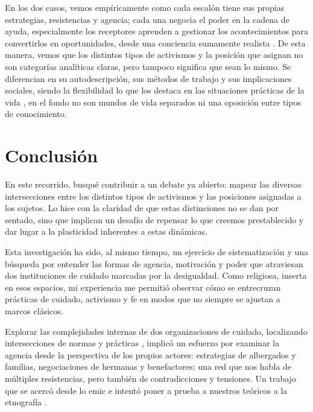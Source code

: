 \documentclass[
  spanish,
  11pt,
  a4paper,
]{scrbook}
\begin{document}
En los dos casos, vemos empíricamente como cada escalón tiene sus
propias estrategias, resistencias y agencia; cada una negocia el poder
en la cadena de ayuda, especialmente los receptores aprenden a gestionar
los acontecimientos para convertirlos en oportunidades, desde una
conciencia sumamente realista \autocite[28-29]{Rossi2006}. De esta
manera, vemos que los distintos tipos de activismos y la posición que
asignan no son categorías analíticas claras, pero tampoco significa que
sean lo mismo. Se diferencian en su autodescripción, sus métodos de
trabajo y sus implicaciones sociales, siendo la flexibilidad lo que los
destaca en las situaciones prácticas de la vida
\autocite[311]{PodgornikJakil2021}, en el fondo no son mundos de vida
separados ni una oposición entre tipos de conocimiento.

\section*{Conclusión}\label{conclusiuxf3n}


En este recorrido, busqué contribuir a un debate ya abierto: mapear las
diversas intersecciones entre los distintos tipos de activismos y las
posiciones asignadas a los sujetos. Lo hice con la claridad de que estas
distinciones no se dan por sentado, sino que implican un desafío de
repensar lo que creemos prestablecido y dar lugar a la plasticidad
inherentes a estas dinámicas.

Esta investigación ha sido, al mismo tiempo, un ejercicio de
sistematización y una búsqueda por entender las formas de agencia,
motivación y poder que atraviesan dos instituciones de cuidado marcadas
por la desigualdad. Como religiosa, inserta en esos espacios, mi
experiencia me permitió observar cómo se entrecruzan prácticas de
cuidado, activismo y fe en modos que no siempre se ajustan a marcos
clásicos.

Explorar las complejidades internas de dos organizaciones de cuidado,
localizando intersecciones de normas y prácticas
\autocite[4]{AgudoSanchiz2023}, implicó un esfuerzo por examinar la
agencia desde la perspectiva de los propios actores: estrategias de
albergados y familias, negociaciones de hermanas y benefactores; una red
que nos habla de múltiples resistencias, pero también de contradicciones
y tensiones. Un trabajo que se acercó desde lo emic e intentó poner a
prueba a nuestros teóricos a la etnografía \autocite[27]{Fassin2016}.
\end{document}
